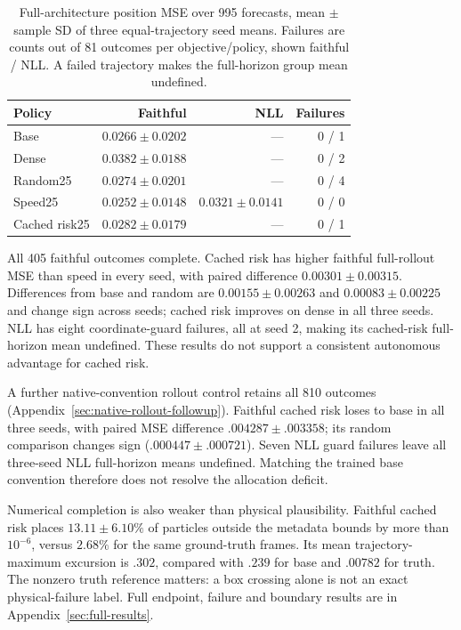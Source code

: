 \begin{table}[t]
\centering\small
\caption{Full-architecture position MSE over 995 forecasts, mean $\pm$ sample SD of three equal-trajectory seed means. Failures are counts out of 81 outcomes per objective/policy, shown faithful / NLL. A failed trajectory makes the full-horizon group mean undefined.}
\label{tab:full-rollouts}
\begin{tabular}{lrrr}
\toprule
Policy & Faithful & NLL & Failures\\
\midrule
Base & $0.0266\pm0.0202$ & --- & 0 / 1\\
Dense & $0.0382\pm0.0188$ & --- & 0 / 2\\
Random25 & $0.0274\pm0.0201$ & --- & 0 / 4\\
Speed25 & $0.0252\pm0.0148$ & $0.0321\pm0.0141$ & 0 / 0\\
Cached risk25 & $0.0282\pm0.0179$ & --- & 0 / 1\\
\bottomrule
\end{tabular}
\end{table}

All 405 faithful outcomes complete. Cached risk has higher faithful full-rollout MSE than speed in every seed, with paired difference $0.00301\pm0.00315$. Differences from base and random are $0.00155\pm0.00263$ and $0.00083\pm0.00225$ and change sign across seeds; cached risk improves on dense in all three seeds. NLL has eight coordinate-guard failures, all at seed 2, making its cached-risk full-horizon mean undefined. These results do not support a consistent autonomous advantage for cached risk.

A further native-convention rollout control retains all 810 outcomes (Appendix~\ref{sec:native-rollout-followup}). Faithful cached risk loses to base in all three seeds, with paired MSE difference $.004287\pm.003358$; its random comparison changes sign ($.000447\pm.000721$). Seven NLL guard failures leave all three-seed NLL full-horizon means undefined. Matching the trained base convention therefore does not resolve the allocation deficit.

Numerical completion is also weaker than physical plausibility. Faithful cached risk places $13.11\pm6.10\%$ of particles outside the metadata bounds by more than $10^{-6}$, versus $2.68\%$ for the same ground-truth frames. Its mean trajectory-maximum excursion is $.302$, compared with $.239$ for base and $.00782$ for truth. The nonzero truth reference matters: a box crossing alone is not an exact physical-failure label. Full endpoint, failure and boundary results are in Appendix~\ref{sec:full-results}.

